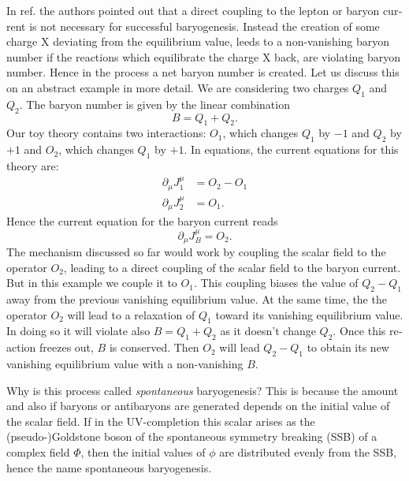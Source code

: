 \documentclass[master,       %
               twoside,        %
               BCOR10mm,       %
               english,ngerman, %
               ]{GAUBM}
\newcommand{\todo}[1]{{\color{magenta}{#1}}}
\begin{document}
\begin{otherlanguage}{english}
In ref. \cite{Domcke:2020kcp_Generic_Couplings} the authors pointed out that a direct coupling to the lepton or baryon current is not necessary for successful baryogenesis.
Instead the creation of some charge X deviating from the equilibrium value, leeds to a non-vanishing baryon number if the reactions which equilibrate the charge X back, are violating baryon number. Hence in the process a net baryon number is created.
Let us discuss this on an abstract example in more detail.
We are considering two charges $Q_1$ and $Q_2$. The baryon number is given by the linear combination
\begin{equation}
	B = Q_1 + Q_2.
\end{equation}
Our toy theory contains two interactions: $O_1$, which changes $Q_1$ by $-1$ and $Q_2$ by $+1$ and $O_2$, which changes $Q_1$ by $+1$. In equations, the current equations for this theory are:
\begin{align}
	\partial_\mu J_1^\mu &= O_2 - O_1 \\
	\partial_\mu J_2^\mu &= O_1 \nonumber.
\end{align}
Hence the current equation for the baryon current reads
\begin{equation}
	\partial_\mu J_B^\mu = O_2.
\end{equation}
The mechanism discussed so far would work by coupling the scalar field to the operator $O_2$, leading to a direct coupling of the scalar field to the baryon current. But in this example we couple it to $O_1$.
This coupling biases the value of $Q_2 - Q_1$ away from the previous vanishing equilibrium value.
At the same time, the the operator $O_2$ will lead to a relaxation of $Q_1$ toward its vanishing equilibrium value. In doing so it will violate also $B = Q_1 + Q_2$ as it doesn't change $Q_2$. Once this reaction freezes out, $B$ is conserved. Then $O_2$ will lead $Q_2 - Q_1$ to obtain its new vanishing equilibrium value with a non-vanishing $B$.
\todo{A cartoon of this process is shown in fig. ????? TODO}

Why is this process called \emph{spontaneous} baryogenesis?
This is because the amount and also if baryons or antibaryons are generated depends on the initial value of the scalar field.
If in the UV-completion this scalar arises as the (pseudo-)Goldstone boson of the spontaneous symmetry breaking (SSB) of a complex field $\Phi$, then the initial values of $\phi$ are distributed evenly from the SSB, hence the name spontaneous baryogenesis.


\end{otherlanguage}
\end{document}
